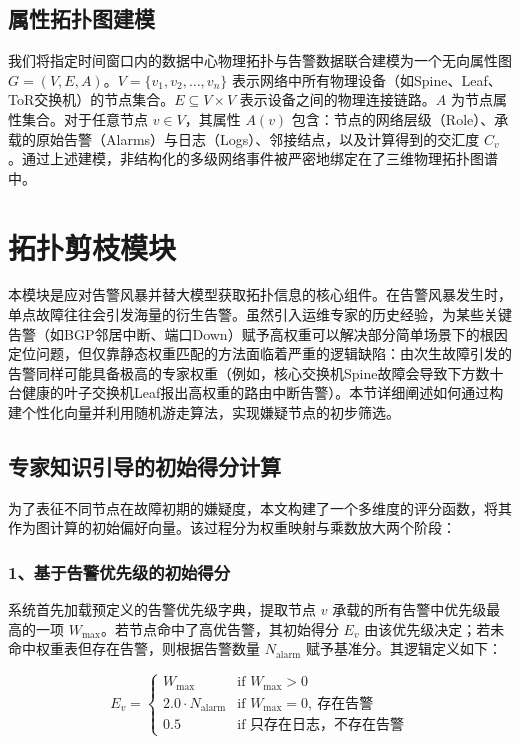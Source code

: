 \subsection{属性拓扑图建模}

我们将指定时间窗口内的数据中心物理拓扑与告警数据联合建模为一个无向属性图 $G = (V, E, A)$。$V = \{v_1, v_2, \ldots, v_n\}$ 表示网络中所有物理设备（如Spine、Leaf、ToR交换机）的节点集合。$E \subseteq V \times V$ 表示设备之间的物理连接链路。$A$ 为节点属性集合。对于任意节点 $v \in V$，其属性 $A(v)$ 包含：节点的网络层级（Role）、承载的原始告警（Alarms）与日志（Logs）、邻接结点，以及计算得到的交汇度 $C_v$。通过上述建模，非结构化的多级网络事件被严密地绑定在了三维物理拓扑图谱中。

\section{拓扑剪枝模块}\label{sec:topo}
本模块是应对告警风暴并替大模型获取拓扑信息的核心组件。在告警风暴发生时，单点故障往往会引发海量的衍生告警。虽然引入运维专家的历史经验，为某些关键告警（如BGP邻居中断、端口Down）赋予高权重可以解决部分简单场景下的根因定位问题，但仅靠静态权重匹配的方法面临着严重的逻辑缺陷：由次生故障引发的告警同样可能具备极高的专家权重（例如，核心交换机Spine故障会导致下方数十台健康的叶子交换机Leaf报出高权重的路由中断告警）。本节详细阐述如何通过构建个性化向量并利用随机游走算法，实现嫌疑节点的初步筛选。

\subsection{专家知识引导的初始得分计算}\label{sec:ini}
为了表征不同节点在故障初期的嫌疑度，本文构建了一个多维度的评分函数，将其作为图计算的初始偏好向量。该过程分为权重映射与乘数放大两个阶段：

\subsubsection{1、基于告警优先级的初始得分}

系统首先加载预定义的告警优先级字典，提取节点 $v$ 承载的所有告警中优先级最高的一项 $W_{\max}$。若节点命中了高优告警，其初始得分 $E_v$ 由该优先级决定；若未命中权重表但存在告警，则根据告警数量 $N_{\text{alarm}}$ 赋予基准分。其逻辑定义如下：

\begin{equation}
E_v = 
\begin{cases}
W_{\max} & \text{if } W_{\max} > 0 \\[4pt]
2.0 \cdot N_{\text{alarm}} & \text{if } W_{\max} = 0,\ \text{存在告警} \\[4pt]
0.5 & \text{if 只存在日志，不存在告警}
\end{cases}
\end{equation}

